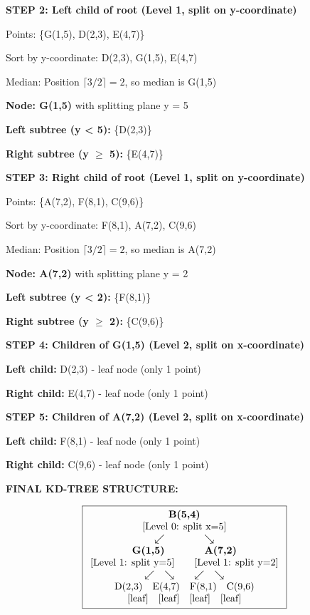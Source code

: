 \documentclass[12pt]{article}
\begin{document}
\begin{solution}
\textbf{STEP 2: Left child of root (Level 1, split on y-coordinate)}

Points: \{G(1,5), D(2,3), E(4,7)\}

Sort by y-coordinate: D(2,3), G(1,5), E(4,7)

Median: Position \(\lceil 3/2 \rceil = 2\), so median is G(1,5)

\textbf{Node: G(1,5)} with splitting plane y = 5

\textbf{Left subtree (y < 5):} \{D(2,3)\}

\textbf{Right subtree (y $\geq$ 5):} \{E(4,7)\}

\textbf{STEP 3: Right child of root (Level 1, split on y-coordinate)}

Points: \{A(7,2), F(8,1), C(9,6)\}

Sort by y-coordinate: F(8,1), A(7,2), C(9,6)

Median: Position \(\lceil 3/2 \rceil = 2\), so median is A(7,2)

\textbf{Node: A(7,2)} with splitting plane y = 2

\textbf{Left subtree (y < 2):} \{F(8,1)\}

\textbf{Right subtree (y $\geq$ 2):} \{C(9,6)\}

\textbf{STEP 4: Children of G(1,5) (Level 2, split on x-coordinate)}

\textbf{Left child:} D(2,3) - leaf node (only 1 point)

\textbf{Right child:} E(4,7) - leaf node (only 1 point)

\textbf{STEP 5: Children of A(7,2) (Level 2, split on x-coordinate)}

\textbf{Left child:} F(8,1) - leaf node (only 1 point)

\textbf{Right child:} C(9,6) - leaf node (only 1 point)

\textbf{FINAL KD-TREE STRUCTURE:}

\[
\boxed{
\begin{array}{c}
\text{\textbf{B(5,4)}} \\
\text{[Level 0: split x=5]} \\
\swarrow \qquad \qquad \searrow \\
\text{\textbf{G(1,5)}} \qquad \qquad \text{\textbf{A(7,2)}} \\
\text{[Level 1: split y=5]} \qquad \text{[Level 1: split y=2]} \\
\swarrow \quad \searrow \qquad \swarrow \quad \searrow \\
\text{D(2,3)} \quad \text{E(4,7)} \quad \text{F(8,1)} \quad \text{C(9,6)} \\
\text{[leaf]} \quad \text{[leaf]} \quad \text{[leaf]} \quad \text{[leaf]}
\end{array}
}
\]


\end{solution}
\end{document}
